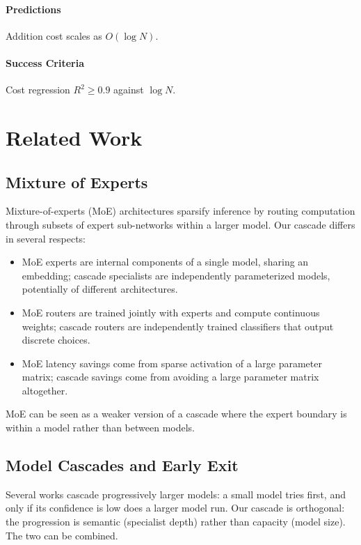 \documentclass[11pt,a4paper]{article}
\theoremstyle{definition}
\theoremstyle{remark}
\begin{document}
\paragraph{Predictions}
Addition cost scales as $O(\log N)$.

\paragraph{Success Criteria}
Cost regression $R^2 \geq 0.9$ against $\log N$.

\section{Related Work}
\label{sec:related}

\subsection{Mixture of Experts}

Mixture-of-experts (MoE) architectures \citep{jacobs1991adaptive, shazeer2017outrageously, fedus2022switch} sparsify inference by routing computation through subsets of expert sub-networks within a larger model. Our cascade differs in several respects:
\begin{itemize}
    \item MoE experts are internal components of a single model, sharing an embedding; cascade specialists are independently parameterized models, potentially of different architectures.
    \item MoE routers are trained jointly with experts and compute continuous weights; cascade routers are independently trained classifiers that output discrete choices.
    \item MoE latency savings come from sparse activation of a large parameter matrix; cascade savings come from avoiding a large parameter matrix altogether.
\end{itemize}
MoE can be seen as a weaker version of a cascade where the expert boundary is within a model rather than between models.

\subsection{Model Cascades and Early Exit}

Several works \citep{panda2016conditional, bolukbasi2017adaptive} cascade progressively larger models: a small model tries first, and only if its confidence is low does a larger model run. Our cascade is orthogonal: the progression is semantic (specialist depth) rather than capacity (model size). The two can be combined.
\end{document}

